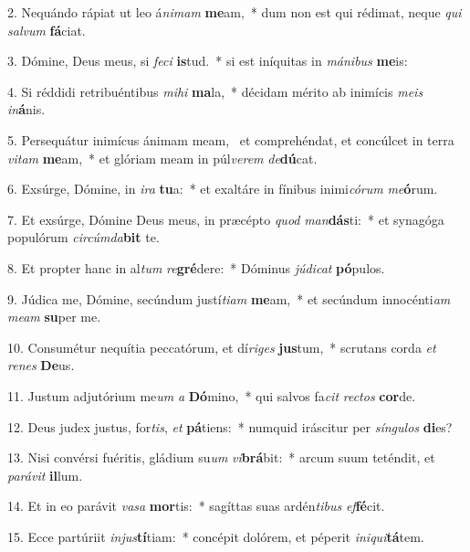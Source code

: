 2. Nequándo rápiat ut leo á\textit{ni}\textit{mam} \textbf{me}am,~*  dum non est qui rédimat, neque \textit{qui} \textit{sal}\textit{vum} \textbf{fá}ciat.\

3. Dómine, Deus meus, si \textit{fe}\textit{ci} \textbf{is}tud.~*  si est iníquitas in \textit{má}\textit{ni}\textit{bus} \textbf{me}is:\

4. Si réddidi retribuéntibus \textit{mi}\textit{hi} \textbf{ma}la,~*  décidam mérito ab inimícis \textit{me}\textit{is} \textit{in}\textbf{á}nis.\

5. Persequátur inimícus ánimam meam, \dag\  et comprehéndat, et concúlcet in terra \textit{vi}\textit{tam} \textbf{me}am,~*  et glóriam meam in púl\textit{ve}\textit{rem} \textit{de}\textbf{dú}cat.\

6. Exsúrge, Dómine, in \textit{i}\textit{ra} \textbf{tu}a:~*  et exaltáre in fínibus inimi\textit{có}\textit{rum} \textit{me}\textbf{ó}rum.\

7. Et exsúrge, Dómine Deus meus, in præcépto \textit{quod} \textit{man}\textbf{dás}ti:~*  et synagóga populórum \textit{cir}\textit{cúm}\textit{da}\textbf{bit} te.\

8. Et propter hanc in al\textit{tum} \textit{re}\textbf{gré}dere:~*  Dóminus \textit{jú}\textit{di}\textit{cat} \textbf{pó}pulos.\

9. Júdica me, Dómine, secúndum justí\textit{ti}\textit{am} \textbf{me}am,~*  et secúndum innocénti\textit{am} \textit{me}\textit{am} \textbf{su}per me.\

10. Consumétur nequítia peccatórum, et dí\textit{ri}\textit{ges} \textbf{jus}tum,~*  scrutans corda \textit{et} \textit{re}\textit{nes} \textbf{De}us.\

11. Justum adjutórium me\textit{um} \textit{a} \textbf{Dó}mino,~*  qui salvos fa\textit{cit} \textit{rec}\textit{tos} \textbf{cor}de.\

12. Deus judex justus, for\textit{tis}, \textit{et} \textbf{pá}tiens:~*  numquid iráscitur per \textit{sín}\textit{gu}\textit{los} \textbf{di}es?\

13. Nisi convérsi fuéritis, gládium su\textit{um} \textit{vi}\textbf{brá}bit:~*  arcum suum teténdit, et \textit{pa}\textit{rá}\textit{vit} \textbf{il}lum.\

14. Et in eo parávit \textit{va}\textit{sa} \textbf{mor}tis:~*  sagíttas suas ardén\textit{ti}\textit{bus} \textit{ef}\textbf{fé}cit.\

15. Ecce partúriit \textit{in}\textit{jus}\textbf{tí}tiam:~*  concépit dolórem, et péperit \textit{in}\textit{i}\textit{qui}\textbf{tá}tem.\

